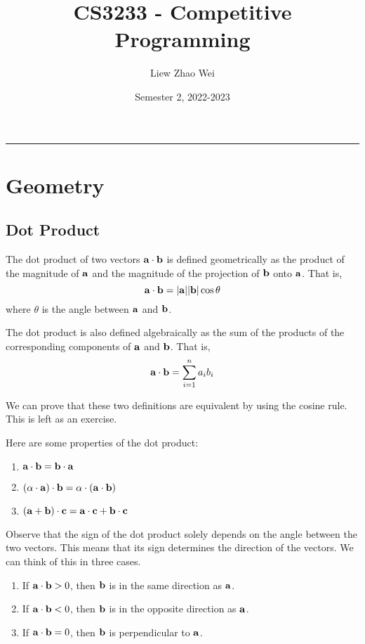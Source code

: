 \documentclass{article}
\title{CS3233 - Competitive Programming}
\author{Liew Zhao Wei}
\date{Semester 2, 2022-2023}
\begin{document}
\maketitle
\hrule

\section{Geometry}

\subsection{Dot Product}

The dot product of two vectors $\vb{a} \cdot \vb{b}$ is defined geometrically as the product of the magnitude of $\vb{a}$ and the magnitude of the projection of $\vb{b}$ onto $\vb{a}$. That is,
$$
\vb{a} \cdot \vb{b} = |\vb{a}| |\vb{b}|\cos{\theta}
$$
 where $\theta$ is the angle between $\vb{a}$ and $\vb{b}$.

The dot product is also defined algebraically as the sum of the products of the corresponding components of $\vb{a}$ and $\vb{b}$. That is,
$$
\vb{a} \cdot \vb{b} = \sum\limits_{i=1}^n a_i b_i
$$

We can prove that these two definitions are equivalent by using the cosine rule. This is left as an exercise.

Here are some properties of the dot product:
\begin{enumerate}
  \item $\vb{a} \cdot \vb{b} = \vb{b} \cdot \vb{a}$
  \item $(\alpha \cdot \vb{a}) \cdot \vb{b} = \alpha \cdot (\vb{a} \cdot \vb{b})$
  \item $(\vb{a} + \vb{b}) \cdot \vb{c} = \vb{a} \cdot \vb{c} + \vb{b} \cdot \vb{c}$
\end{enumerate}

Observe that the sign of the dot product solely depends on the angle between the two vectors. This means that its sign determines the direction of the vectors. We can think of this in three cases.
\begin{enumerate}
  \item If $\vb{a} \cdot \vb{b} > 0$, then $\vb{b}$ is in the same direction as $\vb{a}$.
  \item If $\vb{a} \cdot \vb{b} < 0$, then $\vb{b}$ is in the opposite direction as $\vb{a}$. 
  \item If $\vb{a} \cdot \vb{b} = 0$, then $\vb{b}$ is perpendicular to $\vb{a}$.
\end{enumerate}
\end{document}
